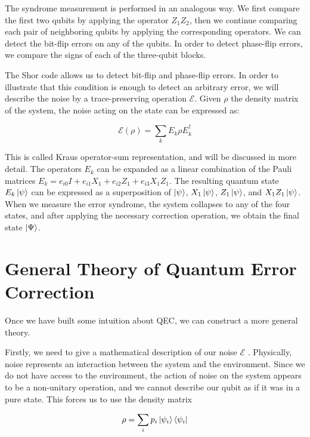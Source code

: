 \documentclass[12pt, twoside, openany]{book}
\begin{document}
The syndrome measurement is performed in an analogous way. We first compare the first two qubits by applying the operator $Z_1 Z_2$, then we continue comparing each pair of neighboring qubits by applying the corresponding operators. We can detect the bit-flip errors on any of the qubits. In order to detect phase-flip errors, we compare the signs of each of the three-qubit blocks. 

The Shor code allows us to detect bit-flip and phase-flip errors. In order to illustrate that this condition is enough to detect an arbitrary error, we will describe the noise by a trace-preserving operation $\mathcal{E}$. Given $\rho$ the density matrix of the system, the noise acting on the state can be expressed as:

\begin{equation} \label{Kraus}
    \mathcal{E}(\rho) = \sum_k E_k \rho E_k^\dagger
\end{equation}

This is called Kraus operator-sum representation, and will be discussed in more detail. The operators $E_k$ can be expanded as a linear combination of the Pauli matrices $E_k = e_{i0} I + e_{i1} X_1 + e_{i2} Z_1 + e_{i3} X_1 Z_1$. The resulting quantum state $E_k \ket{ \psi }$ can be expressed as a superposition of $\ket{\psi}$, $X_1 \ket{\psi}$, $Z_1 \ket{\psi}$, and $X_1 Z_1 \ket{\psi}$. When we measure the error syndrome, the system collapses to any of the four states, and after applying the necessary correction operation, we obtain the final state $\ket{\Psi}$. 

\section{General Theory of Quantum Error Correction}

Once we have built some intuition about QEC, we can construct a more general theory. 

Firstly, we need to give a mathematical description of our noise $\mathcal{E}$ \cite{Girvin2023}. Physically, noise represents an interaction between the system and the environment. Since we do not have access to the environment, the action of noise on the system appears to be a non-unitary operation, and we cannot describe our qubit as if it was in a pure state. This forces us to use the density matrix 

\begin{equation} \label{density}
    \rho = \sum_i p_i \ket{ \psi_i } \bra{ \psi_i }
\end{equation}
\end{document}
